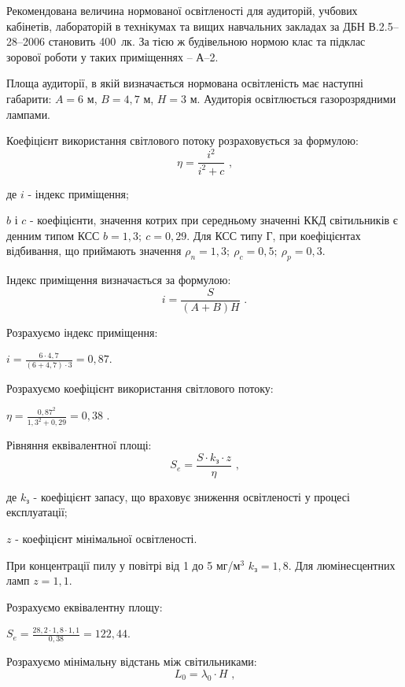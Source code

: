 \documentclass[a4paper,ukrainian,utf8,nocolumnsxix,floatsection,equationsection]{eskdtext}
\begin{document}
Рекомендована величина нормованої освітленості для аудиторій, учбових кабінетів, лабораторій в технікумах та вищих навчальних закладах за ДБН В.2.5–28–2006 становить 400~лк. За тією ж будівельною нормою клас та підклас зорової роботи у таких приміщеннях – А–2.

Площа аудиторії, в якій визначається нормована освітленість має наступні габарити: $A = 6$ м, $B = 4,7$ м, $H = 3$ м. Аудиторія освітлюється газорозрядними лампами.

Коефіцієнт використання світлового потоку розраховується за формулою:
\begin{equation}
	\eta = \frac{i^2}{i^2 + c} \text{ ,}
\end{equation}

де $i$ - індекс приміщення;

$b$ і $c$ - коефіцієнти, значення котрих при середньому значенні ККД світильників є денним типом КСС $b=1,3;\:c = 0,29$. Для КСС типу Г, при коефіцієнтах відбивання, що приймають значення $\rho_n = 1,3;\: \rho_c=0,5;\: \rho_p=0,3$.

Індекс приміщення визначається за формулою:
\begin{equation}
	i = \frac{S}{(A + B)H} \text{ .}
\end{equation}

Розрахуємо індекс приміщення: 

$i = \frac{6 \cdot 4,7}{(6 + 4,7) \cdot 3} = 0,87 $.


Розрахуємо коефіцієнт використання світлового потоку:

$\eta = \frac{0,87^2}{1,3^2 + 0,29} = 0,38$ .


Рівняння еквівалентної площі:
\begin{equation}
	S_e = \frac{S \cdot k_\text{з} \cdot z}{\eta} \text{ ,}
\end{equation}

де $k_\text{з}$ - коефіцієнт запасу, що враховує зниження освітленості у процесі експлуатації;

$z$ - коефіцієнт мінімальної освітленості.


При концентрації пилу у повітрі від 1 до 5 мг/м$^3$ $k_\text{з} = 1,8$. Для люмінесцентних ламп $z = 1,1$.

Розрахуємо еквівалентну площу:

$S_e  = \frac{28,2 \cdot 1,8 \cdot 1,1}{0,38} = 122,44 $.


Розрахуємо мінімальну відстань між світильниками:
\begin{equation}
	L_0 = \lambda_0 \cdot H \text{ ,}
\end{equation}
\end{document}
